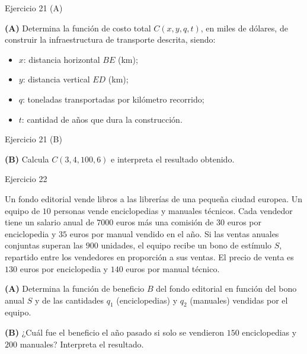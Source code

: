 \documentclass[aspectratio=169]{beamer}
\begin{document}
\begin{frame}{Ejercicio 21 (A)}
  \begin{mwejercicio}
    \textbf{(A)} Determina la función de costo total \(C(x,y,q,t)\), en miles de
    dólares, de construir la infraestructura de transporte descrita, siendo:
    \begin{itemize}
      \item \(x\): distancia horizontal \(BE\) (km);
      \item \(y\): distancia vertical \(ED\) (km);
      \item \(q\): toneladas transportadas por kilómetro recorrido;
      \item \(t\): cantidad de años que dura la construcción.
    \end{itemize}
  \end{mwejercicio}
\end{frame}

\begin{frame}{Ejercicio 21 (B)}
  \begin{mwejercicio}
    \textbf{(B)} Calcula \(C(3,4,100,6)\) e interpreta el resultado obtenido.
  \end{mwejercicio}
\end{frame}

\begin{frame}{Ejercicio 22}
  \begin{mwejercicio}
    Un fondo editorial vende libros a las librerías de una pequeña ciudad
    europea. Un equipo de \(10\) personas vende enciclopedias y manuales
    técnicos. Cada vendedor tiene un salario anual de \(7000\) euros más una
    comisión de \(30\) euros por enciclopedia y \(35\) euros por manual vendido
    en el año. Si las ventas anuales conjuntas superan las \(900\) unidades, el
    equipo recibe un bono de estímulo \(S\), repartido entre los vendedores en
    proporción a sus ventas. El precio de venta es \(130\) euros por
    enciclopedia y \(140\) euros por manual técnico.

    \textbf{(A)} Determina la función de beneficio \(B\) del fondo editorial en
    función del bono anual \(S\) y de las cantidades \(q_1\) (enciclopedias) y
    \(q_2\) (manuales) vendidas por el equipo.

    \textbf{(B)} ¿Cuál fue el beneficio el año pasado si solo se vendieron
    \(150\) enciclopedias y \(200\) manuales? Interpreta el resultado.
  \end{mwejercicio}
\end{frame}
\end{document}
